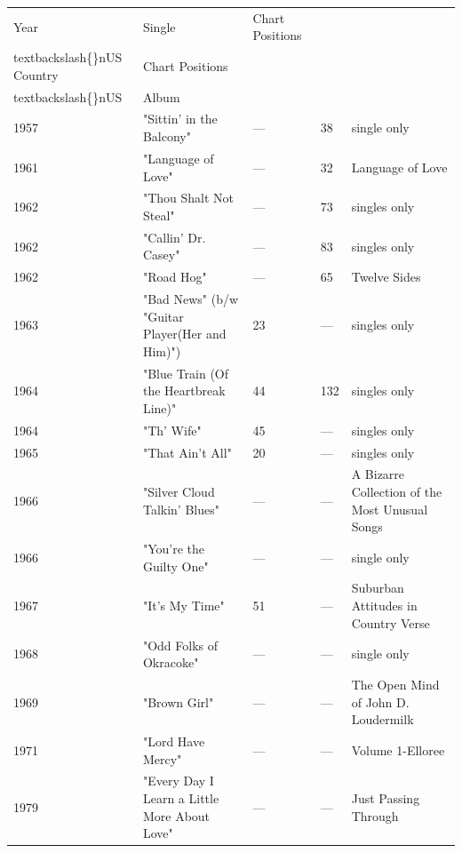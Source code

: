 \documentclass{article}
\begin{document}
\begin{tabular}{lllll}
\toprule
Year & Single & Chart Positions\\textbackslash\{\}nUS Country & Chart Positions\\textbackslash\{\}nUS & Album \\
\midrule
1957 & "Sittin' in the Balcony" & — & 38 & single only \\
1961 & "Language of Love" & — & 32 & Language of Love \\
1962 & "Thou Shalt Not Steal" & — & 73 & singles only \\
1962 & "Callin' Dr. Casey" & — & 83 & singles only \\
1962 & "Road Hog" & — & 65 & Twelve Sides \\
1963 & "Bad News" (b/w "Guitar Player(Her and Him)") & 23 & — & singles only \\
1964 & "Blue Train (Of the Heartbreak Line)" & 44 & 132 & singles only \\
1964 & "Th' Wife" & 45 & — & singles only \\
1965 & "That Ain't All" & 20 & — & singles only \\
1966 & "Silver Cloud Talkin' Blues" & — & — & A Bizarre Collection of the Most Unusual Songs \\
1966 & "You're the Guilty One" & — & — & single only \\
1967 & "It's My Time" & 51 & — & Suburban Attitudes in Country Verse \\
1968 & "Odd Folks of Okracoke" & — & — & single only \\
1969 & "Brown Girl" & — & — & The Open Mind of John D. Loudermilk \\
1971 & "Lord Have Mercy" & — & — & Volume 1-Elloree \\
1979 & "Every Day I Learn a Little More About Love" & — & — & Just Passing Through \\
\bottomrule
\end{tabular}
\end{document}
